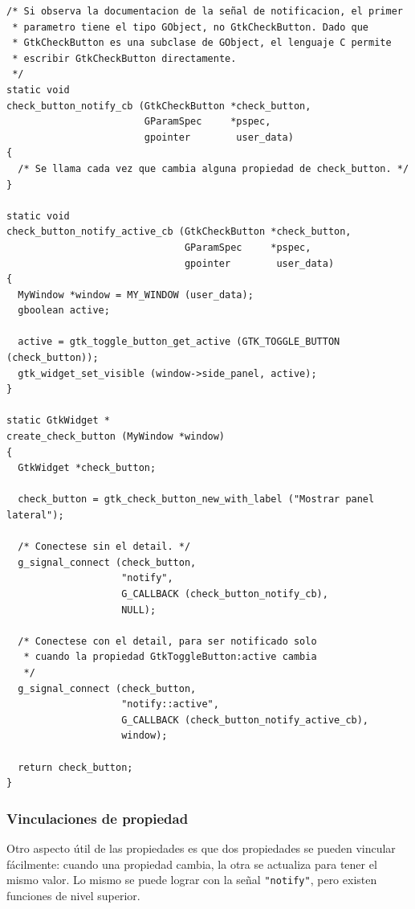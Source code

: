 \begin{lstlisting}[style=GLib/GTK, caption={Conexión a la señal de notificación para escuchar cambios en la propiedad.}, label=oop-gobject-connect-to-notify]
/* Si observa la documentacion de la señal de notificacion, el primer
 * parametro tiene el tipo GObject, no GtkCheckButton. Dado que
 * GtkCheckButton es una subclase de GObject, el lenguaje C permite
 * escribir GtkCheckButton directamente.
 */
static void
check_button_notify_cb (GtkCheckButton *check_button,
                        GParamSpec     *pspec,
                        gpointer        user_data)
{
  /* Se llama cada vez que cambia alguna propiedad de check_button. */
}

static void
check_button_notify_active_cb (GtkCheckButton *check_button,
                               GParamSpec     *pspec,
                               gpointer        user_data)
{
  MyWindow *window = MY_WINDOW (user_data);
  gboolean active;

  active = gtk_toggle_button_get_active (GTK_TOGGLE_BUTTON (check_button));
  gtk_widget_set_visible (window->side_panel, active);
}

static GtkWidget *
create_check_button (MyWindow *window)
{
  GtkWidget *check_button;

  check_button = gtk_check_button_new_with_label ("Mostrar panel lateral");

  /* Conectese sin el detail. */
  g_signal_connect (check_button,
                    "notify",
                    G_CALLBACK (check_button_notify_cb),
                    NULL);

  /* Conectese con el detail, para ser notificado solo
   * cuando la propiedad GtkToggleButton:active cambia
   */
  g_signal_connect (check_button,
                    "notify::active",
                    G_CALLBACK (check_button_notify_active_cb),
                    window);

  return check_button;
}
\end{lstlisting}

\subsubsection{Vinculaciones de propiedad}

Otro aspecto útil de las propiedades es que dos propiedades se pueden vincular fácilmente: cuando una propiedad cambia, la otra se actualiza para tener el mismo valor. Lo mismo se puede lograr con la señal \lstinline{"notify"}, pero existen funciones de nivel superior.

